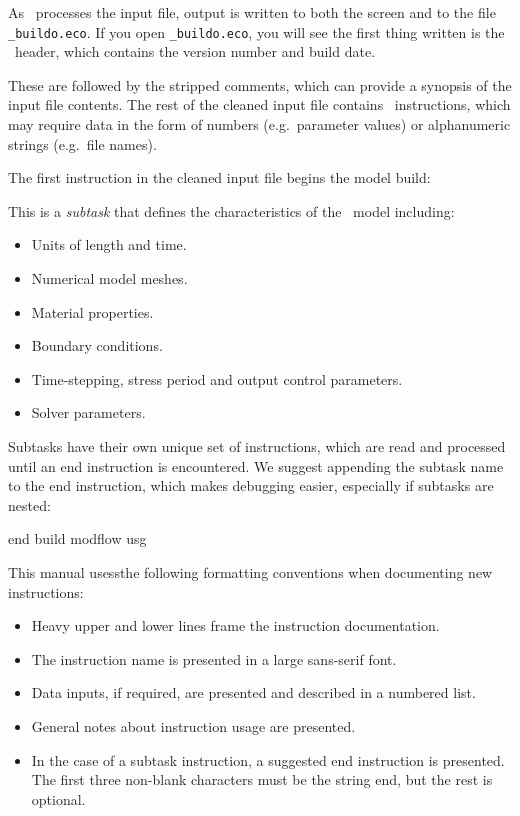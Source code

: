  As \mut\ processes the input file, output is written to both the screen and to the file \texttt{\_buildo.eco}.  If you open \texttt{\_buildo.eco}, you will see the first thing written is the \mut\ header, which contains the version number and build date.

 These are followed by the stripped comments, which  can provide a synopsis of the input file contents. The rest of the cleaned input file contains \mut\ instructions, which may require data in the form of numbers (e.g.\ parameter values) or alphanumeric strings (e.g.\ file names).


The first instruction in the cleaned input file begins the model build:

    {This  is a {\em subtask} that defines the characteristics of the \mfus\ model including:
     \begin{itemize}
        \item Units of length and time.
        \item Numerical model meshes.
        \item Material properties.
        \item Boundary conditions.
        \item Time-stepping, stress period and output control parameters.
        \item Solver parameters.
    \end{itemize}
    Subtasks have their own unique set of instructions, which are read and processed until an \textsf{end} instruction is encountered.  We suggest appending the subtask name to the \textsf{end} instruction, which makes debugging easier, especially if subtasks are nested:

    {\Large \sf end build modflow usg}
    }

This manual usessthe following formatting conventions when documenting new instructions:
\begin{itemize}
  \item Heavy upper and lower lines frame the instruction documentation.
  \item The instruction name is presented in a large sans-serif font.
  \item Data inputs, if required, are presented and described in a numbered list.
  \item General notes about instruction usage are presented.
  \item In the case of a subtask instruction, a suggested \textsf{end} instruction is presented.  The first three non-blank characters must be the string \textsf{end}, but the rest is optional.
\end{itemize}

